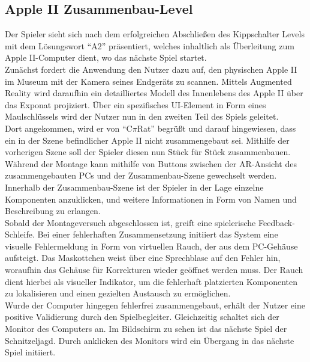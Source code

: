 \subsection{Apple II Zusammenbau-Level}
Der Spieler sieht sich nach dem erfolgreichen Abschließen des Kippschalter Levels mit dem Lösungswort “A2” präsentiert, welches inhaltlich als Überleitung zum Apple II-Computer dient, wo das nächste Spiel startet.\\
Zunächst fordert die Anwendung den Nutzer dazu auf, den physischen Apple II im Museum mit der Kamera seines Endgeräts zu scannen. Mittels Augmented Reality wird daraufhin ein detailliertes Modell des Innenlebens des Apple II über das Exponat projiziert. Über ein spezifisches UI-Element in Form eines Maulschlüssels wird der Nutzer nun in den zweiten Teil des Spiels geleitet.\\
Dort angekommen, wird er von “C$\pi$Rat” begrüßt und darauf hingewiesen, dass ein in der Szene befindlicher Apple II nicht zusammengebaut sei. Mithilfe der vorherigen Szene soll der Spieler diesen nun Stück für Stück zusammenbauen. Während der Montage kann mithilfe von Buttons zwischen der AR-Ansicht des zusammengebauten PCs und der Zusammenbau-Szene gewechselt werden. Innerhalb der Zusammenbau-Szene ist der Spieler in der Lage einzelne Komponenten anzuklicken, und weitere Informationen in Form von Namen und Beschreibung zu erlangen.\\
Sobald der Montageversuch abgeschlossen ist, greift eine spielerische Feedback-Schleife. Bei einer fehlerhaften Zusammensetzung initiiert das System eine visuelle Fehlermeldung in Form von virtuellen Rauch, der aus dem PC-Gehäuse aufsteigt. Das Maskottchen weist über eine Sprechblase auf den Fehler hin, woraufhin das Gehäuse für Korrekturen wieder geöffnet werden muss. Der Rauch dient hierbei als visueller Indikator, um die fehlerhaft platzierten Komponenten zu lokalisieren und einen gezielten Austausch zu ermöglichen.\\

Wurde der Computer hingegen fehlerfrei zusammengebaut, erhält der Nutzer eine positive Validierung durch den Spielbegleiter. Gleichzeitig schaltet sich der Monitor des Computers an. Im Bildschirm zu sehen ist das nächste Spiel der Schnitzeljagd. Durch anklicken des Monitors wird ein Übergang in das nächste Spiel initiiert.

